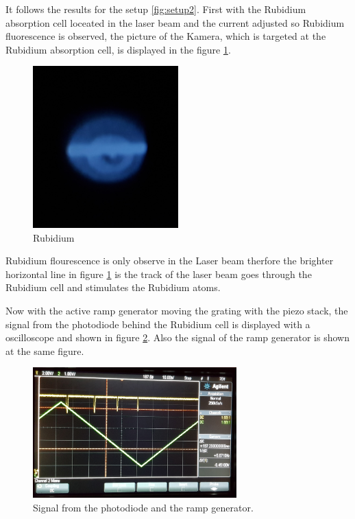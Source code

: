 It follows the results for the setup \ref{fig:setup2}.
First with the Rubidium absorption cell loceated in the laser beam
and the current adjusted so Rubidium fluorescence is observed, the picture of the
Kamera, which is targeted at the
Rubidium absorption cell, is
displayed in the figure \ref{fig:Floures}.

\begin{figure}
  \centering
  \includegraphics[width = 0.5\textwidth]{figures/Rb_leuchten.jpg}
  \caption{Rubidium }
  \label{fig:Floures}
\end{figure}

Rubidium flourescence is only observe in the Laser beam therfore
the brighter horizontal line
in figure \ref{fig:Floures}
is the track of the laser beam
goes through the Rubidium cell and stimulates the Rubidium atoms.

Now with the active ramp generator moving the grating with the piezo stack,
the signal from the photodiode behind the Rubidium cell
is displayed with a
oscilloscope and shown in figure \ref{fig:ramp}.
Also the signal of the ramp generator is shown at the same
figure.

\begin{figure}
  \centering
  \includegraphics[width = 0.7\textwidth]{figures/Ramp.jpg}
  \caption{Signal from the photodiode and the ramp generator.}
  \label{fig:ramp}
\end{figure}

